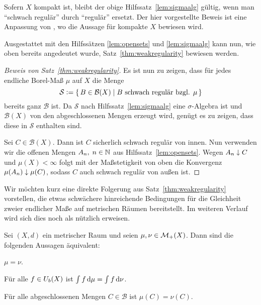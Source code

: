\documentclass[../main/main.tex]{subfiles}
\begin{document}
	\begin{Bemerkung}
		Sofern $X$ kompakt ist, bleibt der obige Hilfssatz~\ref{lem:sigmaalg} 
		gültig, wenn man \enquote{schwach regulär} durch \enquote{regulär} 
		ersetzt. Der hier vorgestellte Beweis ist eine Anpassung von 
		\cite[Lemma 4.5.5]{Simon.2015}, wo die Aussage für kompakte $X$ bewiesen wird.
	\end{Bemerkung}
	
	Ausgestattet mit den Hilfssätzen \ref{lem:opensets} und \ref{lem:sigmaalg} kann nun, 
	wie oben bereits angedeutet wurde, Satz~\ref{thm:weakregularity} bewiesen werden.
	
	\begin{proof}[Beweis von Satz~\ref{thm:weakregularity}]
		Es ist nun zu zeigen, dass für jedes endliche Borel-Maß $\mu$ auf $X$
		die Menge 
		$$\mathcal{S} \vcentcolon = \left\{\, B \in \mathcal{B}(X) \; \middle| \; B \text{ schwach regulär bzgl. } \mu \,\right\}$$
		bereits ganz $\mathcal{B}$ ist. 
		Da $\mathcal{S}$ nach Hilfssatz~\ref{lem:sigmaalg} eine 
		$\sigma$-Algebra ist und 
		$\mathcal{B}(X)$ von den abgeschlossenen Mengen erzeugt wird, genügt es zu zeigen, 
		dass diese in $\mathcal{S}$ enthalten sind. 
		
		Sei $C \in \mathcal{B}(X)$. Dann ist $C$ sicherlich schwach regulär von innen. 
		Nun verwenden wir die offenen Mengen $A_n, \; n \in \mathbb{N}$ aus 
		Hilfssatz~\ref{lem:opensets}. 
		Wegen $A_n \downarrow C$ und $\mu(X) < \infty$ folgt mit der 
		Maßstetigkeit von oben die Konvergenz $\mu(A_n) \downarrow \mu(C)$,
		sodass $C$ auch schwach regulär von außen ist.
	\end{proof}
	
	Wir möchten kurz eine direkte Folgerung aus Satz~\ref{thm:weakregularity} vorstellen, die etwas 
	schwächere hinreichende Bedingungen für die Gleichheit 
	zweier endlicher Maße auf metrischen Räumen bereitstellt. Im weiteren Verlauf 
	wird sich dies noch als nützlich erweisen.
	
	\begin{Satz}
		\label{thm:measureequality}
		Sei $(X,d)$ ein metrischer Raum und seien $\mu, \nu \in \mathcal{M}_{+}(X)$. 
		Dann sind die folgenden Aussagen äquivalent:
		\begin{equivalentthm}
			\item $\mu = \nu$.
			\item Für alle $f \in U_b(X)$ ist
			$\int_{} \, f \, \mathrm{d}\mu = \int_{} \, f \, \mathrm{d}\nu$.
			\item Für alle abgeschlossenen Mengen $C \in \mathcal{B}$ ist $\mu(C) = \nu(C)$.
		\end{equivalentthm}
	\end{Satz}
	
\end{document}
